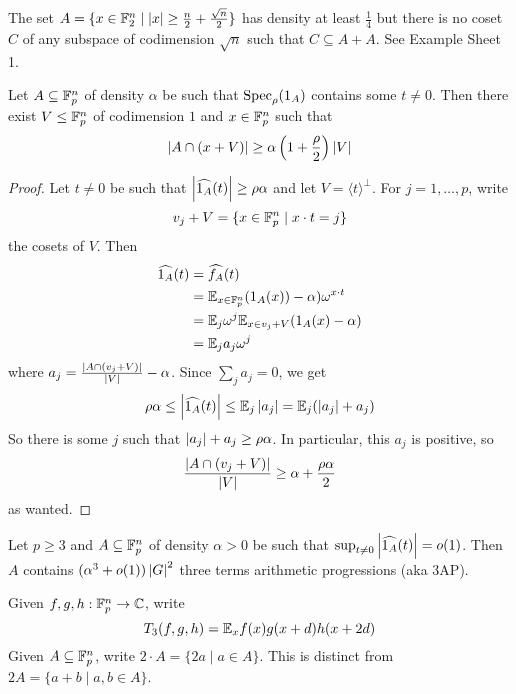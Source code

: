 \documentclass{article}
\begin{document}
\begin{nex}
  The set $A = \{x \in \mathbb F_2^n \mid \left\lvert x\right\rvert \ge \frac n2 + \frac{\sqrt n}2\}$ has density at least $\frac 14$ but there is no coset $C$ of any subspace of codimension $\sqrt n$ such that $C \subseteq A + A$. See Example Sheet 1.
\end{nex}

\begin{nlemma}\label{lem:density-increment}
  Let $A \subseteq \mathbb F_p^n$ of density $\alpha$ be such that $\operatorname{Spec}_\rho(1_A)$ contains some $t \ne 0$. Then there exist $V \le \mathbb F_p^n$ of codimension $1$ and $x \in \mathbb F_p^n$ such that
  $$\left\lvert A \cap (x + V)\right\rvert \ge \alpha\left(1 + \frac\rho 2\right)\left\lvert V\right\rvert$$
\end{nlemma}
\begin{proof}
  Let $t \ne 0$ be such that $\left\lvert \widehat{1_A}(t)\right\rvert \ge \rho\alpha$ and let $V = \langle t\rangle^\perp$. For $j = 1, \dots, p$, write
  $$v_j + V = \{x \in \mathbb F_p^n \mid x \cdot t = j\}$$
  the cosets of $V$. Then
  \begin{align*}
    \widehat{1_A}(t)
    & = \widehat{f_A}(t) \\
    & = \mathbb E_{x \in \mathbb F_p^n}(1_A(x)) - \alpha)\omega^{x \cdot t} \\
    & = \mathbb E_j \omega^j \mathbb E_{x \in v_j + V} (1_A(x) - \alpha) \\
    & = \mathbb E_j a_j \omega^j
  \end{align*}
  where $a_j = \frac{\left\lvert A \cap (v_j + V)\right\rvert}{\left\lvert V\right\rvert} - \alpha$. Since $\sum_j a_j = 0$, we get
  $$\rho\alpha \le \left\lvert \widehat{1_A}(t)\right\rvert \le \mathbb E_j \left\lvert a_j\right\rvert = \mathbb E_j (\left\lvert a_j\right\rvert + a_j)$$
  So there is some $j$ such that $\left\lvert a_j\right\rvert + a_j \ge \rho\alpha$. In particular, this $a_j$ is positive, so
   $$\frac{\left\lvert A \cap (v_j + V)\right\rvert}{\left\lvert V\right\rvert} \ge \alpha + \frac{\rho\alpha}2$$
   as wanted.
\end{proof}

\newlec

\begin{nlemma}\label{lem:3AP-estimate}
  Let $p \ge 3$ and $A \subseteq \mathbb F_p^n$ of density $\alpha > 0$ be such that $\sup_{t \ne 0} \left\lvert \widehat{1_A}(t)\right\rvert = o(1)$. Then $A$ contains $(\alpha^3 + o(1))\left\lvert G\right\rvert^2$ three terms arithmetic progressions (aka 3AP).
\end{nlemma}

\begin{notation}
  Given $f, g, h : \mathbb F_p^n \to \mathbb C$, write
  $$T_3(f, g, h) = \mathbb E_x f(x) g(x + d) h(x + 2d)$$
  Given $A \subseteq \mathbb F_p^n$, write $2 \cdot A = \{2a \mid a \in A\}$. This is distinct from $2A = \{a + b \mid a, b \in A\}$.
\end{notation}
\end{document}
